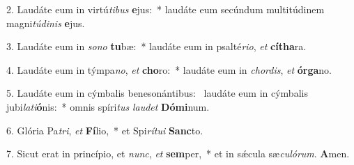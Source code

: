 2. Laudáte eum in virtú\textit{ti}\textit{bus} \textbf{e}jus:~*  laudáte eum secúndum multitúdinem magni\textit{tú}\textit{di}\textit{nis} \textbf{e}jus.\

3. Laudáte eum in \textit{so}\textit{no} \textbf{tu}bæ:~*  laudáte eum in psalté\textit{ri}\textit{o}, \textit{et} \textbf{cí}\textbf{tha}ra.\

4. Laudáte eum in týmpa\textit{no}, \textit{et} \textbf{cho}ro:~*  laudáte eum in \textit{chor}\textit{dis}, \textit{et} \textbf{ór}\textbf{ga}no.\

5. Laudáte eum in cýmbalis benesonántibus: \dag\  laudáte eum in cýmbalis jubi\textit{la}\textit{ti}\textbf{ó}nis:~*  omnis spíri\textit{tus} \textit{lau}\textit{det} \textbf{Dó}\textbf{mi}num.\

6. Glória Pa\textit{tri}, \textit{et} \textbf{Fí}lio,~*  et Spi\textit{rí}\textit{tu}\textit{i} \textbf{Sanc}to.\

7. Sicut erat in princípio, et \textit{nunc}, \textit{et} \textbf{sem}per,~*  et in sǽcula sæ\textit{cu}\textit{ló}\textit{rum}. \textbf{A}men.\


